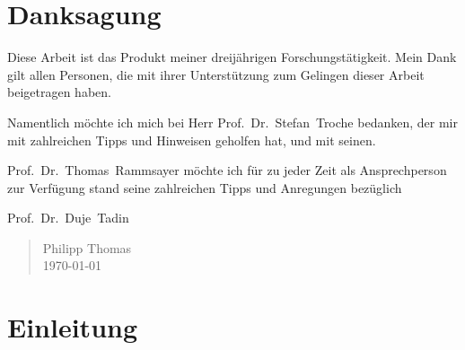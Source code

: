 \documentclass[11pt, twoside, a4paper]{book}		%
\begin{document}
\renewcommand{\contentsname}{Inhalte}			%
\setcounter{tocdepth}{3}						%
\tableofcontents								%




\clearpage
\chapter*{\LARGE Danksagung}
\vspace{-.7cm}
Diese Arbeit ist das Produkt meiner dreijährigen Forschungstätigkeit. Mein Dank gilt allen Personen, die mit ihrer Unterstützung zum Gelingen dieser Arbeit beigetragen haben.

Namentlich möchte ich mich bei Herr \mbox{Prof. Dr. Stefan Troche} bedanken, der mir mit zahlreichen Tipps und Hinweisen geholfen hat, und mit seinen.

\mbox{Prof. Dr. Thomas Rammsayer} möchte ich für zu jeder Zeit als Ansprechperson zur Verfügung stand seine zahlreichen Tipps und Anregungen bezüglich 


\mbox{Prof. Dr. Duje Tadin}  




\vspace{6 mm}

\begin{quote}
Philipp Thomas\\
\today
\end{quote}





\mainmatter				%



\chapter{Einleitung \label{cha:Einleitung}}
\end{document}
